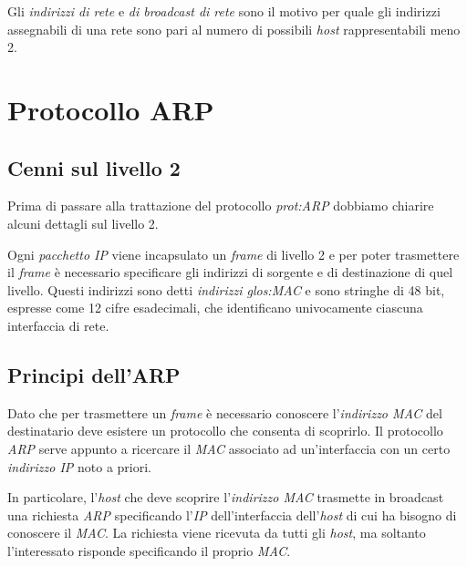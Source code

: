 
\begin{note}
    Gli \emph{indirizzi di rete} e \emph{di broadcast di rete} sono il motivo per
    quale gli indirizzi assegnabili di una rete sono pari al numero di possibili
    \emph{host} rappresentabili meno 2.
\end{note}

\section{Protocollo ARP}
\subsection{Cenni sul livello 2}
Prima di passare alla trattazione del protocollo \emph{\gls{prot:ARP}} dobbiamo
chiarire alcuni dettagli sul livello 2.

Ogni \emph{pacchetto IP} viene incapsulato un \emph{frame} di livello 2 e per
poter trasmettere il \emph{frame} è necessario specificare gli indirizzi di
sorgente e di destinazione di quel livello. Questi indirizzi sono detti
\emph{indirizzi \gls{glos:MAC}} e sono stringhe di 48 bit, espresse come 12
cifre esadecimali, che identificano univocamente ciascuna interfaccia di rete.

\newpage
\subsection{Principi dell'ARP}
Dato che per trasmettere un \emph{frame} è necessario conoscere l'\emph{indirizzo
MAC} del destinatario deve esistere un protocollo che consenta di scoprirlo.
Il protocollo \emph{ARP} serve appunto a ricercare il \emph{MAC} associato ad
un'interfaccia con un certo \emph{indirizzo IP} noto a priori.

In particolare, l'\emph{host} che deve scoprire l'\emph{indirizzo MAC} trasmette
in broadcast una richiesta \emph{ARP} specificando l'\emph{IP} dell'interfaccia
dell'\emph{host} di cui ha bisogno di conoscere il \emph{MAC}. La richiesta
viene ricevuta da tutti gli \emph{host}, ma soltanto l'interessato risponde
specificando il proprio \emph{MAC}.


